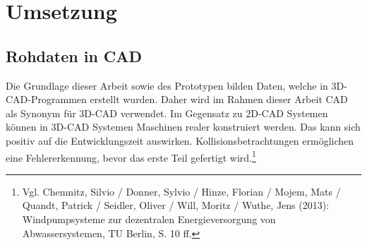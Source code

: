 \chapter{Umsetzung}
\section{Rohdaten in CAD}

Die Grundlage dieser Arbeit sowie des Prototypen bilden Daten, welche in 3D-CAD-Programmen erstellt wurden. Daher wird im Rahmen dieser Arbeit CAD als Synonym für 3D-CAD verwendet. Im Gegensatz zu 2D-CAD Systemen können in 3D-CAD Systemen Maschinen realer konstruiert werden. Das kann sich positiv auf die Entwicklungszeit auswirken. Kollisionsbetrachtungen ermöglichen eine Fehlererkennung, bevor das erste Teil gefertigt wird.\footnote{Vgl. Chemnitz, Silvio / Donner, Sylvio / Hinze, Florian / Mojem, Mats / Quandt, Patrick / Seidler, Oliver / Will, Moritz / Wuthe, Jens  (2013): Windpumpsysteme zur dezentralen Energieversorgung von Abwassersystemen, TU Berlin, S. 10 ff.}